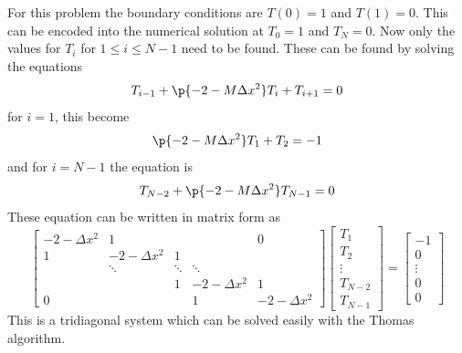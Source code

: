 \documentclass[11pt, oneside]{article}
\begin{document}
\begin{enumerate}
\begin{enumerate}
        For this problem the boundary conditions are $T(0) = 1$ and $T(1) = 0$.
        This can be encoded into the numerical solution at $T_0 = 1$ and
        $T_N = 0$.
        Now only the values for $T_i$ for $1 \le i \le N - 1$ need to be found.
        These can be found by solving the equations
        \[
          T_{i - 1} + \p{- 2 - M\Delta x^2}T_i + T_{i+1} = 0
        \]
        for $i = 1$, this become
        \[
           \p{- 2 - M\Delta x^2}T_1 + T_2 = -1
        \]
        and for $i = N - 1$ the equation is
        \[
          T_{N - 2} + \p{- 2 - M\Delta x^2}T_{N - 1} = 0
        \]
        These equation can be written in matrix form as
        \[
          \begin{bmatrix}
            -2 - \Delta x^2 & 1 & & & 0 \\
            1 & -2 - \Delta x^2 & 1 &  \\
             & \ddots & \ddots & \ddots &  \\
             &  & 1 & -2 - \Delta x^2  & 1  \\
            0 &  &  & 1 & -2 - \Delta x^2
          \end{bmatrix}
          \begin{bmatrix}
            T_1 \\
            T_2 \\
            \vdots \\
            T_{N - 2} \\
            T_{N - 1}
          \end{bmatrix}
          =
          \begin{bmatrix}
            -1 \\
            0 \\
            \vdots \\
            0 \\
            0
          \end{bmatrix}
        \]
        This is a tridiagonal system which can be solved easily with the
        Thomas algorithm.


\end{enumerate}
\end{enumerate}
\end{document}
